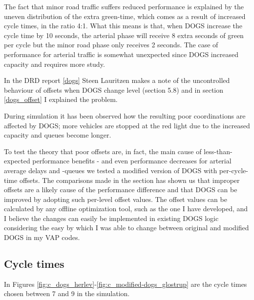 The fact that minor road traffic suffers reduced performance is explained by the uneven distribution of the extra green-time, which comes as a result of increased cycle times, in the ratio 4:1. What this means is that, when DOGS increase the cycle time by 10 seconds, the arterial phase will receive 8 extra seconds of green per cycle but the minor road phase only receives 2 seconds. 
The case of performance for arterial traffic is somewhat unexpected since DOGS increased capacity and requires more study.

In the DRD report \ref{dogs} Steen Lauritzen makes a note of the uncontrolled behaviour of offsets when DOGS change level (section 5.8) and in section \ref{dogs_offset} I explained the problem.

During simulation it has been observed how the resulting poor coordinations are affected by DOGS; more vehicles are stopped at the red light due to the increased capacity and queues become longer. 

To test the theory that poor offsets are, in fact, the main cause of less-than-expected performance benefits - and even performance decreases for arterial average delays and -queues we tested a modified version of DOGS with per-cycle-time offsets. The comparisons made in the section has shown us that improper offsets are a likely cause of the performance difference and that DOGS can be improved by adopting such per-level offset values. The offset values can be calculated by any offline optimization tool, such as the one I have developed, and I believe the changes can easily be implemented in existing DOGS logic considering the easy by which I was able to change between original and modified DOGS in my VAP codes.

\subsection{Cycle times}
In Figures \ref{fig:c_dogs_herlev}-\ref{fig:c_modified-dogs_glostrup} are the cycle times chosen between 7 and 9 in the simulation.

